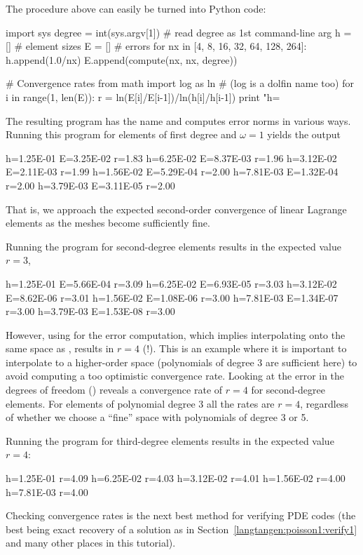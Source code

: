 The procedure above can easily be turned into Python code:
\begin{python}
import sys
degree = int(sys.argv[1])  # read degree as 1st command-line arg
h = []  # element sizes
E = []  # errors
for nx in [4, 8, 16, 32, 64, 128, 264]:
    h.append(1.0/nx)
    E.append(compute(nx, nx, degree))

# Convergence rates
from math import log as ln  # (log is a dolfin name too)
for i in range(1, len(E)):
    r = ln(E[i]/E[i-1])/ln(h[i]/h[i-1])
    print "h=%
\end{python}
The resulting program has the name
  and computes error
norms in various ways. Running this program for elements of first
degree and $\omega=1$ yields the output
\begin{progoutput}
h=1.25E-01 E=3.25E-02 r=1.83
h=6.25E-02 E=8.37E-03 r=1.96
h=3.12E-02 E=2.11E-03 r=1.99
h=1.56E-02 E=5.29E-04 r=2.00
h=7.81E-03 E=1.32E-04 r=2.00
h=3.79E-03 E=3.11E-05 r=2.00
\end{progoutput}
\noindent
That is, we approach the expected second-order convergence of linear
Lagrange elements as the meshes become sufficiently fine.

Running the program for second-degree elements results in the expected
value $r=3$,
\begin{progoutput}
h=1.25E-01 E=5.66E-04 r=3.09
h=6.25E-02 E=6.93E-05 r=3.03
h=3.12E-02 E=8.62E-06 r=3.01
h=1.56E-02 E=1.08E-06 r=3.00
h=7.81E-03 E=1.34E-07 r=3.00
h=3.79E-03 E=1.53E-08 r=3.00
\end{progoutput}
\noindent
However, using  for the
error computation, which implies interpolating
 onto the same space as
, results in $r=4$ (!). This is an
example where it is important to interpolate
 to a higher-order space
(polynomials of degree 3 are sufficient here) to avoid computing a too
optimistic convergence rate. Looking at the error in the degrees of
freedom () reveals a
convergence rate of $r=4$ for second-degree elements. For elements of
polynomial degree 3 all the rates are $r=4$, regardless of whether we
choose a ``fine'' space  with
polynomials of degree 3 or 5.

Running the program for third-degree elements results in the expected
value $r=4$:
\begin{progoutput}
h=1.25E-01 r=4.09
h=6.25E-02 r=4.03
h=3.12E-02 r=4.01
h=1.56E-02 r=4.00
h=7.81E-03 r=4.00
\end{progoutput}
\noindent
Checking convergence rates is the next best method for verifying PDE
codes (the best being exact recovery of a solution as in
Section~\ref{langtangen:poisson1:verify1} and many other places in
this tutorial).

